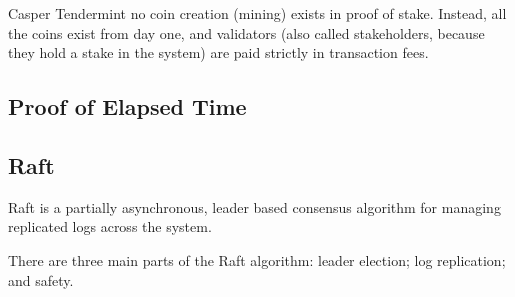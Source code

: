 Casper
Tendermint
no coin creation (mining) exists in proof of stake. Instead, all the coins exist from day one, and validators (also called stakeholders, because they hold a stake in the system) are paid strictly in transaction fees.




\subsection{Proof of Elapsed Time}


\subsection{Raft}
Raft is a partially asynchronous, leader based consensus algorithm for managing replicated logs across the system. 

There are three main parts of the Raft algorithm: leader election; log replication; and safety. 

